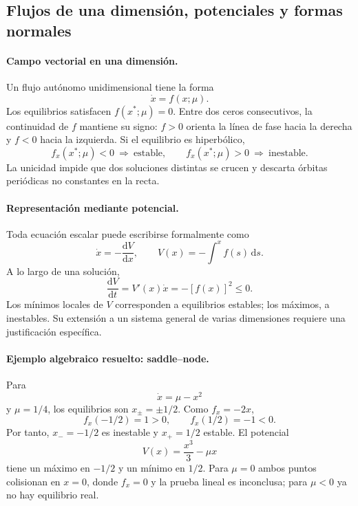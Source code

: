 
\subsection{Flujos de una dimensión, potenciales y formas normales}

\paragraph{Campo vectorial en una dimensión.}
Un flujo autónomo unidimensional tiene la forma
\[
 \dot x=f(x;\mu).
\]
Los equilibrios satisfacen \(f(x^*;\mu)=0\). Entre dos ceros consecutivos, la
continuidad de \(f\) mantiene su signo: \(f>0\) orienta la línea de fase hacia la
derecha y \(f<0\) hacia la izquierda. Si el equilibrio es hiperbólico,
\[
 f_x(x^*;\mu)<0\ \Longrightarrow\ \text{estable},\qquad
 f_x(x^*;\mu)>0\ \Longrightarrow\ \text{inestable}.
\]
La unicidad impide que dos soluciones distintas se crucen y descarta órbitas
periódicas no constantes en la recta.

\paragraph{Representación mediante potencial.}
Toda ecuación escalar puede escribirse formalmente como
\[
 \dot x=-\frac{\mathrm dV}{\mathrm dx},
 \qquad
 V(x)=-\int^x f(s)\,\mathrm ds.
\]
A lo largo de una solución,
\[
 \frac{\mathrm dV}{\mathrm dt}=V'(x)\dot x=-[f(x)]^2\leq0.
\]
Los mínimos locales de \(V\) corresponden a equilibrios estables; los máximos, a
inestables. Su extensión a un sistema general de varias dimensiones requiere una
justificación específica.

\paragraph{Ejemplo algebraico resuelto: saddle--node.}
Para
\[
 \dot x=\mu-x^2
\]
y \(\mu=1/4\), los equilibrios son \(x_\pm=\pm1/2\). Como
\(f_x=-2x\),
\[
 f_x(-1/2)=1>0,\qquad f_x(1/2)=-1<0.
\]
Por tanto, \(x_-=-1/2\) es inestable y \(x_+=1/2\) estable. El potencial
\[
 V(x)=\frac{x^3}{3}-\mu x
\]
tiene un máximo en \(-1/2\) y un mínimo en \(1/2\). Para \(\mu=0\) ambos puntos
colisionan en \(x=0\), donde \(f_x=0\) y la prueba lineal es inconclusa; para
\(\mu<0\) ya no hay equilibrio real.

